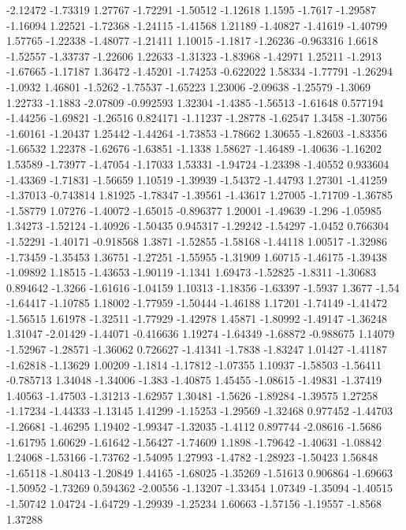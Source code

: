 \documentclass[9pt]{article}
\theoremstyle{plain}
\theoremstyle{definition}
\theoremstyle{remark}
\numberwithin{equation}{section}
\begin{document}
-2.12472
-1.73319
1.27767
-1.72291
-1.50512
-1.12618
1.1595
-1.7617
-1.29587
-1.16094
1.22521
-1.72368
-1.24115
-1.41568
1.21189
-1.40827
-1.41619
-1.40799
1.57765
-1.22338
-1.48077
-1.21411
1.10015
-1.1817
-1.26236
-0.963316
1.6618
-1.52557
-1.33737
-1.22606
1.22633
-1.31323
-1.83968
-1.42971
1.25211
-1.2913
-1.67665
-1.17187
1.36472
-1.45201
-1.74253
-0.622022
1.58334
-1.77791
-1.26294
-1.0932
1.46801
-1.5262
-1.75537
-1.65223
1.23006
-2.09638
-1.25579
-1.3069
1.22733
-1.1883
-2.07809
-0.992593
1.32304
-1.4385
-1.56513
-1.61648
0.577194
-1.44256
-1.69821
-1.26516
0.824171
-1.11237
-1.28778
-1.62547
1.3458
-1.30756
-1.60161
-1.20437
1.25442
-1.44264
-1.73853
-1.78662
1.30655
-1.82603
-1.83356
-1.66532
1.22378
-1.62676
-1.63851
-1.1338
1.58627
-1.46489
-1.40636
-1.16202
1.53589
-1.73977
-1.47054
-1.17033
1.53331
-1.94724
-1.23398
-1.40552
0.933604
-1.43369
-1.71831
-1.56659
1.10519
-1.39939
-1.54372
-1.44793
1.27301
-1.41259
-1.37013
-0.743814
1.81925
-1.78347
-1.39561
-1.43617
1.27005
-1.71709
-1.36785
-1.58779
1.07276
-1.40072
-1.65015
-0.896377
1.20001
-1.49639
-1.296
-1.05985
1.34273
-1.52124
-1.40926
-1.50435
0.945317
-1.29242
-1.54297
-1.0452
0.766304
-1.52291
-1.40171
-0.918568
1.3871
-1.52855
-1.58168
-1.44118
1.00517
-1.32986
-1.73459
-1.35453
1.36751
-1.27251
-1.55955
-1.31909
1.60715
-1.46175
-1.39438
-1.09892
1.18515
-1.43653
-1.90119
-1.1341
1.69473
-1.52825
-1.8311
-1.30683
0.894642
-1.3266
-1.61616
-1.04159
1.10313
-1.18356
-1.63397
-1.5937
1.3677
-1.54
-1.64417
-1.10785
1.18002
-1.77959
-1.50444
-1.46188
1.17201
-1.74149
-1.41472
-1.56515
1.61978
-1.32511
-1.77929
-1.42978
1.45871
-1.80992
-1.49147
-1.36248
1.31047
-2.01429
-1.44071
-0.416636
1.19274
-1.64349
-1.68872
-0.988675
1.14079
-1.52967
-1.28571
-1.36062
0.726627
-1.41341
-1.7838
-1.83247
1.01427
-1.41187
-1.62818
-1.13629
1.00209
-1.1814
-1.17812
-1.07355
1.10937
-1.58503
-1.56411
-0.785713
1.34048
-1.34006
-1.383
-1.40875
1.45455
-1.08615
-1.49831
-1.37419
1.40563
-1.47503
-1.31213
-1.62957
1.30481
-1.5626
-1.89284
-1.39575
1.27258
-1.17234
-1.44333
-1.13145
1.41299
-1.15253
-1.29569
-1.32468
0.977452
-1.44703
-1.26681
-1.46295
1.19402
-1.99347
-1.32035
-1.4112
0.897744
-2.08616
-1.5686
-1.61795
1.60629
-1.61642
-1.56427
-1.74609
1.1898
-1.79642
-1.40631
-1.08842
1.24068
-1.53166
-1.73762
-1.54095
1.27993
-1.4782
-1.28923
-1.50423
1.56848
-1.65118
-1.80413
-1.20849
1.44165
-1.68025
-1.35269
-1.51613
0.906864
-1.69663
-1.50952
-1.73269
0.594362
-2.00556
-1.13207
-1.33454
1.07349
-1.35094
-1.40515
-1.50742
1.04724
-1.64729
-1.29939
-1.25234
1.60663
-1.57156
-1.19557
-1.8568
1.37288
\end{document}
